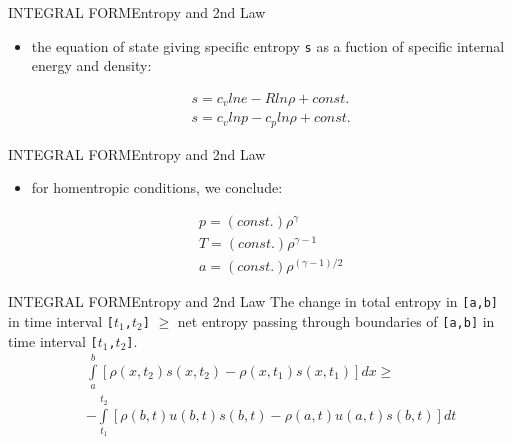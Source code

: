 \documentclass{beamer}
\begin{document}
\begin{frame}{INTEGRAL FORM}{Entropy and 2nd Law}
   \begin{itemize}
   \item the equation of state giving specific entropy \texttt{s} as a fuction of specific internal energy and density:
  \end{itemize}
  \begin{eqnarray}\nonumber
    && s=c_vlne-Rln\rho+const. \\
    && s=c_vlnp-c_pln\rho+const.
  \end{eqnarray}
\end{frame}

\begin{frame}{INTEGRAL FORM}{Entropy and 2nd Law}
   \begin{itemize}
   \item for homentropic conditions, we conclude:
  \end{itemize}
  \begin{eqnarray}\nonumber
    && p=(const.)\rho^\gamma \nonumber \\
    && T=(const.)\rho^{\gamma-1} \nonumber  \\
    && a=(const.)\rho^{(\gamma-1)/2} \nonumber 
  \end{eqnarray}
\end{frame}

\begin{frame}{INTEGRAL FORM}{Entropy and 2nd Law}
  The change in total entropy in \texttt{[a,b]} in time interval \texttt{[$t_1$,$t_2$]} $\geq$ net entropy passing through boundaries of \texttt{[a,b]} in time interval \texttt{[$t_1$,$t_2$]}.
  \begin{eqnarray}\nonumber
    && \int\limits_a^b[\rho(x,t_2)s(x,t_2)-\rho(x,t_1)s(x,t_1)]dx \geq \nonumber \\
    && -\int\limits_{t_1}^{t_2}[\rho(b,t)u(b,t)s(b,t)-\rho(a,t)u(a,t)s(b,t)]dt
  \end{eqnarray}
\end{frame}
\end{document}
